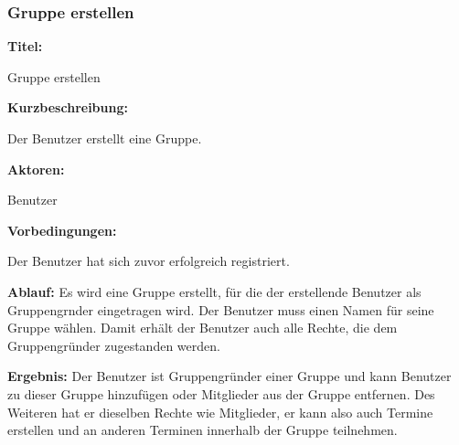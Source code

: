 \documentclass{scrartcl}
\begin{document}
	\subsubsection{Gruppe erstellen}
	\begin{description}
		\item \textbf{Titel:}
		\begin{description}
			\item Gruppe erstellen
		\end{description}
		\item \textbf{Kurzbeschreibung:}
		\begin{description}
			\item Der Benutzer erstellt eine Gruppe.
		\end{description}
		\item \textbf{Aktoren:}
		\begin{description}
			\item Benutzer 
		\end{description}
		\item \textbf{Vorbedingungen:}
		\begin{description}
			\item Der Benutzer hat sich zuvor erfolgreich registriert.
		\end{description}
		\item \textbf{Ablauf:} \newline Es wird eine Gruppe erstellt, für die der erstellende Benutzer als \gls{Gruppengrnder} eingetragen wird. Der Benutzer muss einen Namen für seine Gruppe wählen. Damit erhält der Benutzer auch alle Rechte, die dem Gruppengründer zugestanden werden. 
		\item \textbf{Ergebnis:} \newline Der Benutzer ist Gruppengründer einer Gruppe und kann Benutzer zu dieser Gruppe hinzufügen oder Mitglieder aus der Gruppe entfernen. Des Weiteren hat er dieselben Rechte wie Mitglieder, er kann also auch Termine erstellen und an anderen Terminen innerhalb der Gruppe teilnehmen.
	\end{description}
	
	\newpage
	
\end{document}
